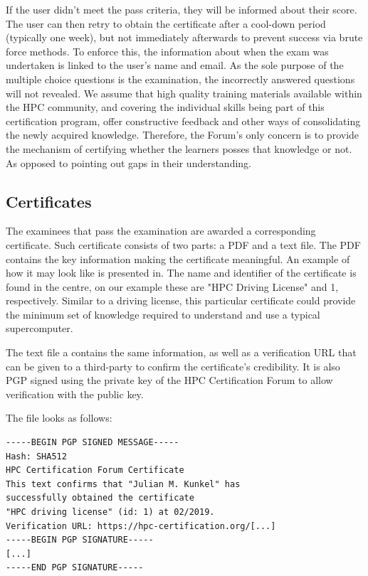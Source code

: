 \documentclass[jocse]{jocseart}
\begin{document}
If the user didn't meet the pass criteria, they will be informed about their score.
The user can then retry to obtain the certificate after a cool-down period (typically one week), but not immediately afterwards to prevent success via brute force methods.
To enforce this, the information about when the exam was undertaken is linked to the user's name and email.
As the sole purpose of the multiple choice questions is the examination, the incorrectly answered questions will not revealed.
We assume that high quality training materials available within the HPC community, and covering the individual skills being part of this certification program, offer constructive feedback and other ways of consolidating the newly acquired knowledge. Therefore, the Forum's only concern is to provide the mechanism of certifying whether the learners posses that knowledge or not. As opposed to pointing out gaps in their understanding.


\subsection{Certificates}

The examinees that pass the examination are awarded a corresponding certificate. Such certificate consists of two parts: a PDF and a text file. 
The PDF contains the key information making the certificate meaningful. An example of how it may look like is presented in.
The name and identifier of the certificate is found in the centre, on our example these are "HPC Driving License" and 1, respectively.  
Similar to a driving license, this particular certificate could provide the minimum set of knowledge required to understand and use a typical supercomputer.

The text file a contains the same information, as well as a verification URL that can be given to a third-party to confirm the certificate's credibility. 
It is also PGP signed using the private key of the HPC Certification Forum to allow verification with the public key.


The file looks as follows:
\begin{verbatim}
-----BEGIN PGP SIGNED MESSAGE-----
Hash: SHA512
HPC Certification Forum Certificate
This text confirms that "Julian M. Kunkel" has
successfully obtained the certificate
"HPC driving license" (id: 1) at 02/2019.
Verification URL: https://hpc-certification.org/[...]
-----BEGIN PGP SIGNATURE-----
[...]
-----END PGP SIGNATURE-----
\end{verbatim}
\end{document}
